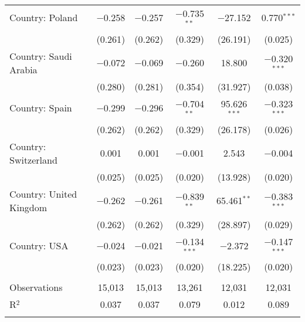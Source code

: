 \begin{tabular}{@{\extracolsep{5pt}}lccccc}
  Country: Poland & $-$0.258 & $-$0.257 & $-$0.735$^{**}$ & $-$27.152 & 0.770$^{***}$ \\ 
  & (0.261) & (0.262) & (0.329) & (26.191) & (0.025) \\ 
  Country: Saudi Arabia & $-$0.072 & $-$0.069 & $-$0.260 & 18.800 & $-$0.320$^{***}$ \\ 
  & (0.280) & (0.281) & (0.354) & (31.927) & (0.038) \\ 
  Country: Spain & $-$0.299 & $-$0.296 & $-$0.704$^{**}$ & 95.626$^{***}$ & $-$0.323$^{***}$ \\ 
  & (0.262) & (0.262) & (0.329) & (26.178) & (0.026) \\ 
  Country: Switzerland & 0.001 & 0.001 & $-$0.001 & 2.543 & $-$0.004 \\ 
  & (0.025) & (0.025) & (0.020) & (13.928) & (0.020) \\ 
  Country: United Kingdom & $-$0.262 & $-$0.261 & $-$0.839$^{**}$ & 65.461$^{**}$ & $-$0.383$^{***}$ \\ 
  & (0.262) & (0.262) & (0.329) & (28.897) & (0.029) \\ 
  Country: USA & $-$0.024 & $-$0.021 & $-$0.134$^{***}$ & $-$2.372 & $-$0.147$^{***}$ \\ 
  & (0.023) & (0.023) & (0.020) & (18.225) & (0.020) \\ 
 \hline \\[-1.8ex] 

Observations & 15,013 & 15,013 & 13,261 & 12,031 & 12,031 \\ 
R$^{2}$ & 0.037 & 0.037 & 0.079 & 0.012 & 0.089 \\ 
\hline 
\hline \\[-1.8ex] 
\end{tabular} 